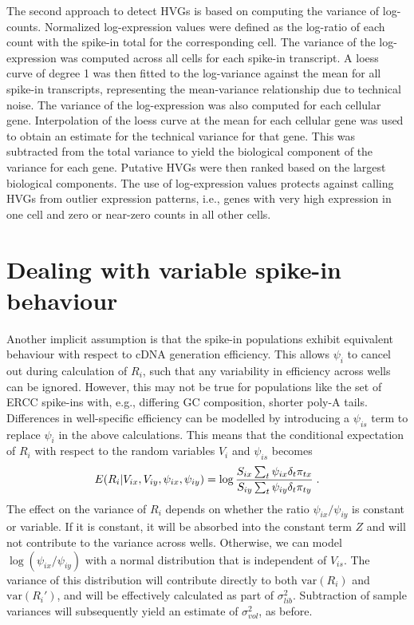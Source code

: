 \documentclass{article}
\begin{document}
The second approach to detect HVGs is based on computing the variance of log-counts.
Normalized log-expression values were defined as the log-ratio of each count with the spike-in total for the corresponding cell.
The variance of the log-expression was computed across all cells for each spike-in transcript.
A loess curve of degree 1 was then fitted to the log-variance against the mean for all spike-in transcripts, representing the mean-variance relationship due to technical noise.
The variance of the log-expression was also computed for each cellular gene.
Interpolation of the loess curve at the mean for each cellular gene was used to obtain an estimate for the technical variance for that gene.
This was subtracted from the total variance to yield the biological component of the variance for each gene.
Putative HVGs were then ranked based on the largest biological components.
The use of log-expression values protects against calling HVGs from outlier expression patterns, i.e., genes with very high expression in one cell and zero or near-zero counts in all other cells.

\newpage
\section{Dealing with variable spike-in behaviour}
Another implicit assumption is that the spike-in populations exhibit equivalent behaviour with respect to cDNA generation efficiency.
This allows $\psi_i$ to cancel out during calculation of $R_i$, such that any variability in efficiency across wells can be ignored.
However, this may not be true for populations like the set of ERCC spike-ins with, e.g., differing GC composition, shorter poly-A tails.
Differences in well-specific efficiency can be modelled by introducing a $\psi_{is}$ term to replace $\psi_i$ in the above calculations.
This means that the conditional expectation of $R_i$ with respect to the random variables $V_{i}$ and $\psi_{is}$ becomes
\[
E(R_i | V_{ix}, V_{iy},  \psi_{ix}, \psi_{iy} ) = \log \frac{ S_{ix} \sum_t \psi_{ix}\delta_{t} \pi_{tx} } { S_{iy}\sum_t \psi_{iy}\delta_{t} \pi_{ty} } \;. \\
\]
The effect on the variance of $R_i$ depends on whether the ratio $\psi_{ix}/\psi_{iy}$ is constant or variable.
If it is constant, it will be absorbed into the constant term $Z$ and will not contribute to the variance across wells.
Otherwise, we can model $\log(\psi_{ix}/\psi_{iy})$ with a normal distribution that is independent of $V_{is}$.
The variance of this distribution will contribute directly to both $\mbox{var}(R_i)$ and $\mbox{var}(R_i')$, and will be effectively calculated as part of $\sigma^2_{lib}$.
Subtraction of sample variances will subsequently yield an estimate of $\sigma^2_{vol}$, as before.
\end{document}
